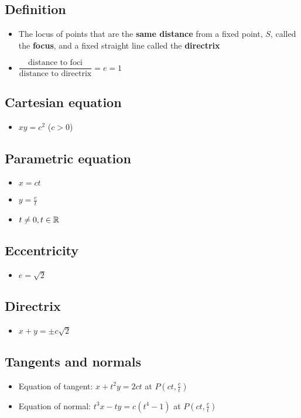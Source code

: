 \subsection{Definition}
\begin{itemize}
    \item The locus of points that are the \textbf{same distance} from a fixed point, $S$, 
    called the \textbf{focus}, and a fixed straight line called the \textbf{directrix}
    \item $\dfrac{\text{distance to foci}}{\text{distance to directrix}} = e = 1$
\end{itemize}
\subsection{Cartesian equation}
\begin{itemize}
    \item $xy=c^2$ ($c>0$)
\end{itemize}
\subsection{Parametric equation}
\begin{itemize}
    \item $x=ct$
    \item $y=\frac{c}{t}$
    \item $t \neq 0, t\in\operatorname{\mathbb{R}}$
\end{itemize}
\subsection{Eccentricity}
\begin{itemize}
    \item $e=\sqrt{2}$
\end{itemize}
\subsection{Directrix}
\begin{itemize}
    \item $x+y=\pm c\sqrt{2}$
\end{itemize}
\subsection{Tangents and normals}
\begin{itemize}
    \item Equation of tangent: $x+t^2y=2ct$ at $P(ct, \frac{c}{t})$
    \item Equation of normal: $t^3x-ty=c(t^4-1)$ at $P(ct, \frac{c}{t})$
\end{itemize}
